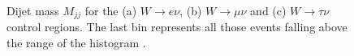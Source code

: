 \begin{figure}[!htb]
\centering
{}
 \\
\caption{Dijet mass $M_{jj}$ for the (a) $W\rightarrow e\nu$, (b) $W\rightarrow\mu\nu$ and (c) $W\rightarrow\tau\nu$ control regions. The last bin represents all those events falling above the range of the histogram \cite{ARTICLE:CMSVBFHiggsInvisibleParkedAnalysisPAS}.}
\label{FIGURE:ParkedDataAnalysis_WBackground_Mjj}
\end{figure}

